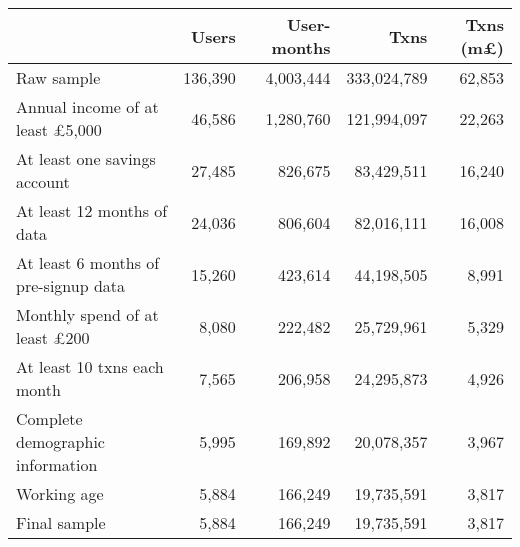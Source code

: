 \begin{tabular}{lrrrr}
\toprule
                                       &   Users & User-months &        Txns & Txns (m\pounds) \\
\midrule
                            Raw sample & 136,390 &   4,003,444 & 333,024,789 &          62,853 \\
Annual income of at least \pounds5,000 &  46,586 &   1,280,760 & 121,994,097 &          22,263 \\
          At least one savings account &  27,485 &     826,675 &  83,429,511 &          16,240 \\
            At least 12 months of data &  24,036 &     806,604 &  82,016,111 &          16,008 \\
  At least 6 months of pre-signup data &  15,260 &     423,614 &  44,198,505 &           8,991 \\
  Monthly spend of at least \pounds200 &   8,080 &     222,482 &  25,729,961 &           5,329 \\
           At least 10 txns each month &   7,565 &     206,958 &  24,295,873 &           4,926 \\
      Complete demographic information &   5,995 &     169,892 &  20,078,357 &           3,967 \\
                           Working age &   5,884 &     166,249 &  19,735,591 &           3,817 \\
                          Final sample &   5,884 &     166,249 &  19,735,591 &           3,817 \\
\bottomrule
\end{tabular}
